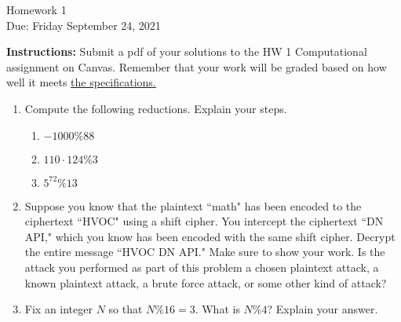 \documentclass[10pt,a4paper]{article}
\begin{document}
\begin{center}
{\Large Homework 1}\\
Due: Friday September 24, 2021\\


\end{center}
{\bf Instructions:} Submit a pdf of your solutions to the HW 1 Computational assignment on Canvas. Remember that your work will be graded based on how well it meets \href{https://docs.google.com/document/d/1emM06_WRh_h941rsjtRE9fRVndJtfRKd9gyS3Fs_rFA/edit?usp=sharing}{the specifications. }

\begin{enumerate}
\item Compute the following reductions.  Explain your steps. 
\begin{enumerate}
\item $-1000 \% 88$
\item $110\cdot 124 \% 3$
\item $5^{72} \% 13$
\end{enumerate}
\item Suppose you know that the plaintext ``math" has been encoded to the ciphertext ``HVOC" using a shift cipher.  You intercept the ciphertext ``DN API," which you know has been encoded with the same shift cipher.  Decrypt the entire message ``HVOC DN API." Make sure to show your work.   Is the attack you performed as part of this problem a chosen plaintext attack, a known plaintext attack, a brute force attack, or some other kind of attack?
\item Fix an integer $N$ so that $N\%16 = 3$.  What is $N\%4$?  Explain your answer.
\end{enumerate}
\end{document}
